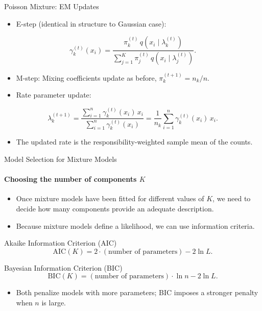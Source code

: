 \begin{frame}{Poisson Mixture: EM Updates}
  \begin{itemize}
    \item E-step (identical in structure to Gaussian case):
  \end{itemize}
  \[
  \gamma_k^{(t)}(x_i)=
  \frac{\pi_k^{(t)}\,q(x_i\mid\lambda_k^{(t)})}{\sum_{j=1}^{K}\pi_j^{(t)}
        \,q(x_i\mid\lambda_j^{(t)})}.
  \]
  \begin{itemize}
    \item M-step: Mixing coefficients update as before, $\pi_k^{(t+1)}=n_k/n$.
    \item Rate parameter update:
  \end{itemize}
  \[
  \lambda_k^{(t+1)}=
  \frac{\sum_{i=1}^{n}\gamma_k^{(t)}(x_i)\,x_i}{\sum_{i=1}^{n}\gamma_k^{(t)}(x_i)}
  =\frac{1}{n_k}\sum_{i=1}^{n}\gamma_k^{(t)}(x_i)\,x_i.
  \]
  \begin{itemize}
    \item The updated rate is the \alert{responsibility-weighted} sample mean of the counts.
  \end{itemize}
\end{frame}

\begin{frame}{Model Selection for Mixture Models}
  \framesubtitle{Choosing the number of components $K$}
  \begin{itemize}
    \item Once mixture models have been fitted for different values of $K$, we need to
          decide how many components provide an adequate description.
    \item Because mixture models define a likelihood, we can use \alert{information criteria}.
  \end{itemize}
  \begin{block}{Akaike Information Criterion (AIC)}
    \[
    \text{AIC}(K)=2\cdot(\text{number of parameters})-2\ln L.
    \]
  \end{block}
  \begin{block}{Bayesian Information Criterion (BIC)}
    \[
    \text{BIC}(K)=(\text{number of parameters})\cdot\ln n-2\ln L.
    \]
  \end{block}
  \begin{itemize}
    \item Both penalize models with more parameters; BIC imposes a stronger penalty when
          $n$ is large.
  \end{itemize}
\end{frame}


